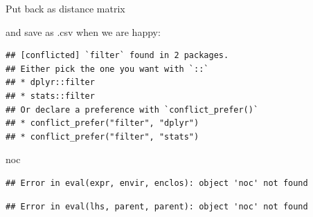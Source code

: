 \documentclass[ignorenonframetext,]{beamer}
\newenvironment{Shaded}{\begin{snugshade}}{\end{snugshade}}
\newcommand{\DecValTok}[1]{\textcolor[rgb]{0.00,0.00,0.81}{#1}}
\newcommand{\KeywordTok}[1]{\textcolor[rgb]{0.13,0.29,0.53}{\textbf{#1}}}
\newcommand{\NormalTok}[1]{#1}
\newcommand{\OperatorTok}[1]{\textcolor[rgb]{0.81,0.36,0.00}{\textbf{#1}}}
\newcommand{\StringTok}[1]{\textcolor[rgb]{0.31,0.60,0.02}{#1}}
\begin{document}
\begin{frame}[fragile]{Put back as distance matrix}
\protect\hypertarget{put-back-as-distance-matrix}{}

and save as .csv when we are happy:

\begin{Shaded}
\end{Shaded}

\begin{verbatim}
## [conflicted] `filter` found in 2 packages.
## Either pick the one you want with `::` 
## * dplyr::filter
## * stats::filter
## Or declare a preference with `conflict_prefer()`
## * conflict_prefer("filter", "dplyr")
## * conflict_prefer("filter", "stats")
\end{verbatim}

\begin{Shaded}
\begin{Highlighting}[]
\NormalTok{noc}
\end{Highlighting}
\end{Shaded}

\begin{verbatim}
## Error in eval(expr, envir, enclos): object 'noc' not found
\end{verbatim}

\begin{Shaded}
\end{Shaded}

\begin{verbatim}
## Error in eval(lhs, parent, parent): object 'noc' not found
\end{verbatim}

\end{frame}
\end{document}

